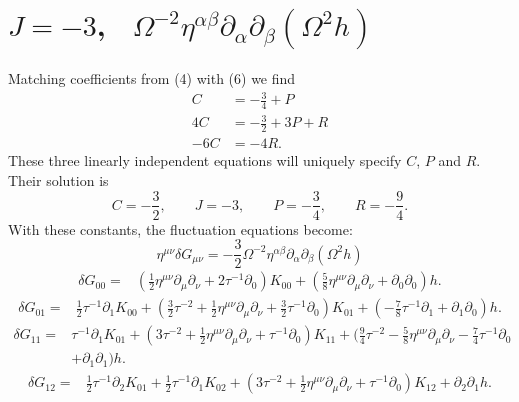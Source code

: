 \documentclass[10pt,letterpaper]{article}
\begin{document}
\section*{ $J=-3$, \ $\Omega^{-2}\eta^{\alpha\beta}\partial_\alpha\partial_\beta (\Omega^2 h)$}
Matching coefficients from (4) with (6) we find
\begin{align}
	C &= -\frac34 + P\\
	4C &= -\frac32 + 3P+R\\
	-6C &= -4R.
\end{align}
These three linearly independent equations will uniquely specify $C$, $P$ and $R$. Their solution is
\begin{equation}
	C = -\frac32,\qquad J=-3,\qquad P = -\frac34,\qquad R =- \frac94.
\end{equation}
With these constants, the fluctuation equations become:
\begin{equation}
\eta^{\mu\nu}\delta G_{\mu\nu} = -\frac32 \Omega^{-2}\eta^{\alpha\beta}\partial_\alpha\partial_\beta (\Omega^2 h)
\end{equation}
\begin{align}
\delta G_{00}={}&(\tfrac{1}{2} \eta^{\mu \nu} \partial_{\mu} \partial_{\nu}
 + 2 \tau^{-1} \partial_{0}) K_{00}
 + (\tfrac{5}{8} \eta^{\mu \nu} \partial_{\mu} \partial_{\nu}
 + \partial_{0} \partial_{0}) h.
\end{align}
\begin{align}
\delta G_{01}={}&\tfrac{1}{2} \tau^{-1} \partial_{1} K_{00}
 + (\tfrac{3}{2} \tau^{-2}
 + \tfrac{1}{2} \eta^{\mu \nu} \partial_{\mu} \partial_{\nu}
 + \tfrac{3}{2} \tau^{-1} \partial_{0}) K_{01}
 + (- \tfrac{7}{8} \tau^{-1} \partial_{1}
 + \partial_{1} \partial_{0}) h.
\end{align}
\begin{align}
\delta G_{11}={}&\tau^{-1} \partial_{1} K_{01}
 + (3 \tau^{-2}
 + \tfrac{1}{2} \eta^{\mu \nu} \partial_{\mu} \partial_{\nu}
 + \tau^{-1} \partial_{0}) K_{11}
 + (\tfrac{9}{4} \tau^{-2}
 -  \tfrac{5}{8} \eta^{\mu \nu} \partial_{\mu} \partial_{\nu}
 -  \tfrac{7}{4} \tau^{-1} \partial_{0}\nonumber\\
& + \partial_{1} \partial_{1}) h.
\end{align}
\begin{align}
\delta G_{12}={}&\tfrac{1}{2} \tau^{-1} \partial_{2} K_{01}
 + \tfrac{1}{2} \tau^{-1} \partial_{1} K_{02}
 + (3 \tau^{-2}
 + \tfrac{1}{2} \eta^{\mu \nu} \partial_{\mu} \partial_{\nu}
 + \tau^{-1} \partial_{0}) K_{12}
 + \partial_{2} \partial_{1} h.
\end{align}
\\
\end{document}
